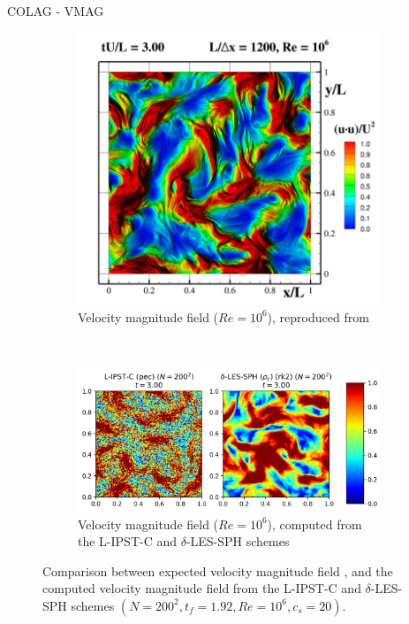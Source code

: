 COLAG - VMAG 
\begin{figure}[htbp!]
  \centering
  \begin{subfigure}{10cm}
  \centering\includegraphics[width=10cm]{Code-Figures/ext-force-tgv/colag_vmag_t_3.png}
  \caption{Velocity magnitude field ($Re = 10^6$), reproduced from \cite{Colagrossi2021QuasiLagrangian}}
  \end{subfigure}
  \\ \vspace{2cm}
  \begin{subfigure}{14cm}
  \centering\includegraphics[width=14cm]{Code-Figures/ext-force-tgv/vmag_t_3.png}
  \caption{Velocity magnitude field ($Re = 10^6$), computed from the L-IPST-C and $\delta$-LES-SPH schemes}
  \end{subfigure}
  \caption{Comparison between expected velocity magnitude field \parencite{Colagrossi2021QuasiLagrangian}, and the computed velocity magnitude field from the L-IPST-C and $\delta$-LES-SPH schemes $(N=200^2, t_f=1.92, Re=10^6, c_s=20)$.}
  \label{fig:tgv-forced-colag-vmag}
\end{figure}

